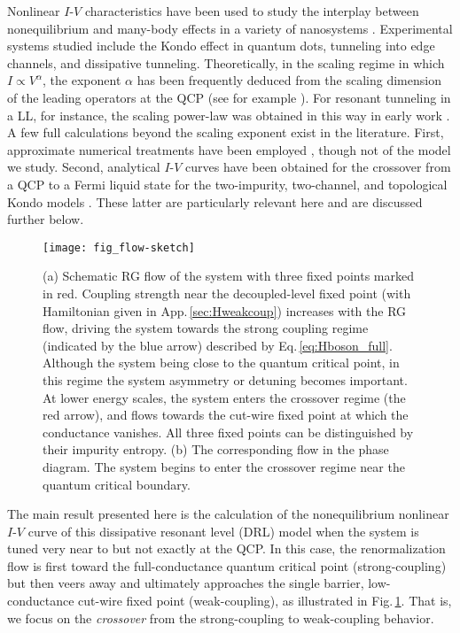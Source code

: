 \documentclass[aps,prb,reprint,floatfix,superscriptaddress,amssymb,amsmath]{revtex4-2}
\begin{document}
Nonlinear $I$-$V$ characteristics have been used to study the interplay between nonequilibrium and many-body effects in a variety of nanosystems \cite{AlhassidRMP00, ChangLLrevRMP03, Micolich0.7Rev11, LevyYeyatiSqdotS-rev11, DavidGG_CarrBook, AnthoreUniversalityRevEPJST20}. 
Experimental systems studied include the Kondo effect in quantum dots, tunneling into edge channels, and dissipative tunneling.  Theoretically, in the scaling regime in which $I\propto V^\alpha$, the exponent $\alpha$ has been frequently deduced from the scaling dimension of the leading operators at the QCP (see for example \cite{FisherGlazman97,AffleckLesHouches10}).  For resonant tunneling in a LL, for instance, the scaling power-law was obtained in this way in early work \cite{KaneFisherPRB92, EggertAffleck92}.  
A few full calculations beyond the scaling exponent exist in the literature. First, approximate numerical treatments have been employed \cite{HettlerPRL94,*HettlerPRB98,vonDelftAnPhys99,BuxboimPRB03,KirchnerSiPRL09, LeeChungPRB13, LandauCornfeldSelaPRL18}, though not of the model we study. Second, analytical $I$-$V$ curves have been obtained for the crossover from a QCP to a Fermi liquid state for the two-impurity, two-channel, and topological Kondo models \cite{SelaExactTransPRL09,*SelaNoneqQdotsPRB09, MitchellSelaPRL16, BeriPRL17}. 
These latter are particularly relevant here and are discussed further below.  


\begin{figure}[b]
\texttt{[image: fig\_flow-sketch]} 
\caption{(a) Schematic RG flow of the system with three fixed points marked in red. Coupling strength near the decoupled-level fixed point (with Hamiltonian given in App.\,\ref{sec:Hweakcoup}) increases with the RG flow, driving the system towards the strong coupling regime (indicated by the blue arrow) described by Eq.\,\eqref{eq:Hboson_full}. Although the system being close to the quantum critical point, in this regime the system asymmetry or detuning becomes important. At lower energy scales, the system enters the crossover regime (the red arrow), and flows towards the cut-wire fixed point at which the conductance vanishes. All three fixed points can be distinguished by their impurity entropy. (b) The corresponding flow in the phase diagram. The system begins to enter the crossover regime near the quantum critical boundary.
}
\label{fig:flow} 
\end{figure}


The main result presented here is the calculation of the nonequilibrium nonlinear $I$-$V$ curve of this dissipative resonant level (DRL) model when the system is tuned very near to but not exactly at the QCP. In this case, the renormalization flow is first toward the full-conductance quantum critical point (strong-coupling) but then veers away and ultimately approaches the single barrier, low-conductance cut-wire fixed point (weak-coupling), as illustrated in Fig.\,\ref{fig:flow}. That is, we focus on the \textit{crossover} from the strong-coupling to weak-coupling behavior.
\end{document}
